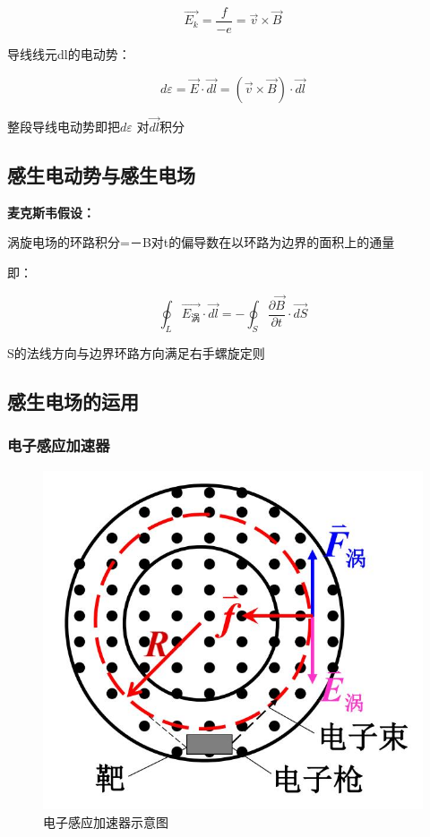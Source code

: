\documentclass{ctexart}
\begin{document}
$$\vec{E_k}=\frac{f}{-e}=\vec{v}\times \vec{B}$$

导线线元dl的电动势：

$$d\varepsilon = \vec{E}·\vec{dl}=(\vec{v}\times \vec{B})·\vec{dl}$$

整段导线电动势即把$d\varepsilon$ 对$\vec{dl}$积分

\subsection{感生电动势与感生电场}

\textbf{麦克斯韦假设：}

涡旋电场的环路积分=－B对t的偏导数在以环路为边界的面积上的通量

即：

$$\oint_{L} \vec{E_涡}·\vec{dl}=-\oint_{S}\frac{\partial \vec{B}}
{\partial t}·\vec{dS}$$

S的法线方向与边界环路方向满足右手螺旋定则

\subsection{感生电场的运用}

\subsubsection{电子感应加速器}

\begin{figure}[h]
	\centering
	\includegraphics[scale=0.4]{images//chapter_14//figure_14.1.jpg} 
	\caption{电子感应加速器示意图}\label{figure14.1}
\end{figure}
\end{document}
